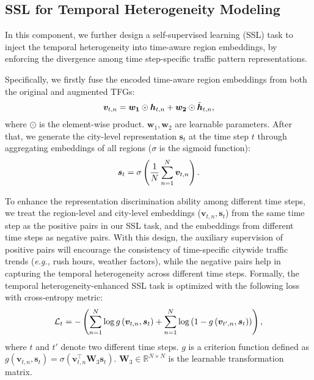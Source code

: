 \documentclass[letterpaper]{article} \usepackage{aaai23}  \usepackage{times}  \usepackage{helvet}  \usepackage{courier}  \usepackage[hyphens]{url}  \usepackage{graphicx} \urlstyle{rm} \def\UrlFont{\rm}  \usepackage{natbib}  \usepackage{caption} \frenchspacing  \setlength{\pdfpagewidth}{8.5in} \setlength{\pdfpageheight}{11in}
\newcommand{\eg}{\emph{e.g.,}\xspace}
\begin{document}
\subsection{SSL for Temporal Heterogeneity Modeling}



In this component, we further design a self-supervised learning (SSL) task to inject the temporal heterogeneity into time-aware region embeddings, by enforcing the divergence among time step-specific traffic pattern representations. 


Specifically, we firstly fuse the encoded time-aware region embeddings from both the original and augmented TFGs:
\begin{equation}\small
    \bm{v}_{t, n} = \bm{w_1} \odot \bm{h}_{t, n} + \bm{w_2} \odot \tilde{\bm h}_{t, n},
\end{equation}
\noindent where $\odot$ is the element-wise product. $\bm w_1, \bm w_2$ are learnable parameters. After that, we generate the city-level representation $\bm s_{t}$ at the time step $t$ through aggregating embeddings of all regions ($\sigma$ is the sigmoid function):
\begin{equation}\small
    \bm s_{t} = \sigma \left(\frac{1}{N} \sum_{n=1}^{N} \bm v_{t,n} \right).
\end{equation}



To enhance the representation discrimination ability among different time steps, we treat the region-level and city-level embeddings ($\bm v_{t, n}, \bm s_{t}$) from the same time step as the positive pairs in our SSL task, and the embeddings from different time steps as negative pairs. With this design, the auxiliary supervision of positive pairs will encourage the consistency of time-specific citywide traffic trends (\eg rush hours, weather factors), while the negative pairs help in capturing the temporal heterogeneity across different time steps. Formally, the temporal heterogeneity-enhanced SSL task is optimized with the following loss with cross-entropy metric:
\begin{equation}\label{eq:loss_t}\small
    \mathcal{L}_t =-\left(\sum_{n=1}^{N} \log g\left(\bm v_{t, n}, \bm s_{t}\right) + \sum_{n=1}^{N} \log \left(1-g\left(\bm v_{t', n}, \bm s_{t}\right)\right)\right),
\end{equation}
\noindent where $t$ and $t'$ denote two different time steps. $g$ is a criterion function defined as $g\left(\bm v_{t, n}, \bm s_{t}\right) = \sigma\left(\bm v_{t,n}^\top \bm W_3 \bm s_{t} \right)$. $\bm W_3 \in \mathbb{R}^{N \times N}$ is the learnable transformation matrix.
\end{document}

